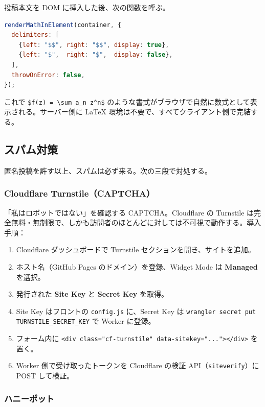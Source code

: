 \documentclass[11pt,a4paper,uplatex,dvipdfmx]{jsarticle}
\begin{document}
投稿本文を DOM に挿入した後、次の関数を呼ぶ。

\begin{lstlisting}[language=JavaScript]
renderMathInElement(container, {
  delimiters: [
    {left: "$$", right: "$$", display: true},
    {left: "$",  right: "$",  display: false},
  ],
  throwOnError: false,
});
\end{lstlisting}

これで \texttt{\$f(z) = \textbackslash sum a\_n z\^{}n\$} のような書式がブラウザで自然に数式として表示される。サーバー側に \LaTeX{} 環境は不要で、すべてクライアント側で完結する。

\subsection{スパム対策}

匿名投稿を許す以上、スパムは必ず来る。次の三段で対処する。

\subsubsection{Cloudflare Turnstile（CAPTCHA）}

「私はロボットではない」を確認する CAPTCHA。Cloudflare の Turnstile は完全無料・無制限で、しかも訪問者のほとんどに対しては不可視で動作する。導入手順：

\begin{enumerate}
\item Cloudflare ダッシュボードで Turnstile セクションを開き、サイトを追加。
\item ホスト名（GitHub Pages のドメイン）を登録、Widget Mode は \textbf{Managed} を選択。
\item 発行された \textbf{Site Key} と \textbf{Secret Key} を取得。
\item Site Key はフロントの \texttt{config.js} に、Secret Key は \texttt{wrangler secret put TURNSTILE\_SECRET\_KEY} で Worker に登録。
\item フォーム内に \texttt{<div class="cf-turnstile" data-sitekey="..."></div>} を置く。
\item Worker 側で受け取ったトークンを Cloudflare の検証 API（\texttt{siteverify}）に POST して検証。
\end{enumerate}

\subsubsection{ハニーポット}
\end{document}

